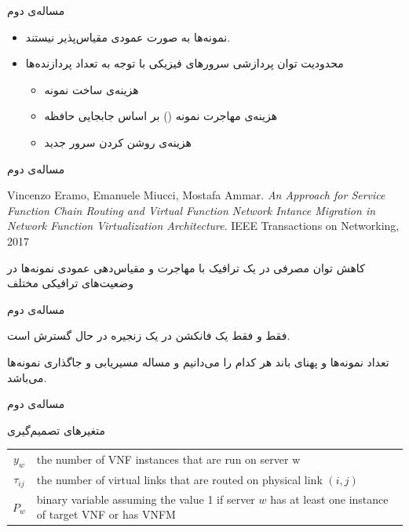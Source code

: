 \documentclass{beamer}
\makeatletter
\newcommand{\RTList}{\raggedleft\rightskip\@totalleftmargin}
\makeatother
\begin{document}
\begin{persian}
\begin{frame}{مساله‌ی دوم}
	\begin{itemize}\RTList{}
		\item نمونه‌ها به صورت عمودی مقیاس‌پذیر نیستند.
		\item محدودیت توان پردازشی سرورهای فیزیکی با توجه به تعداد پردازنده‌ها
		\begin{itemize}\RTList{}
			\item هزینه‌ی ساخت نمونه
			\item هزینه‌ی مهاجرت نمونه () بر اساس جابجایی حافظه
			\item هزینه‌ی روشن کردن سرور جدید
		\end{itemize}
	\end{itemize}
\end{frame}
\begin{frame}{مساله‌ی دوم}
	\begin{latin}\begin{thebibliography}{9}
		Vincenzo Eramo, Emanuele Miucci, Mostafa Ammar.
		\textit{An Approach for Service Function Chain Routing and Virtual Function Network Intance Migration in Network Function Virtualization Architecture}. 
		IEEE Transactions on Networking, 2017
	\end{thebibliography}\end{latin}
	\par
	کاهش توان مصرفی در یک ترافیک 
	با مهاجرت و مقیاس‌دهی عمودی نمونه‌ها در وضعیت‌های ترافیکی مختلف
\end{frame}
\begin{frame}{مساله‌ی دوم}
	\par
	فقط و فقط یک فانکشن در یک زنجیره در حال گسترش است.
	\par
	تعداد نمونه‌ها و پهنای باند هر کدام را می‌دانیم و مساله مسیریابی و جاگذاری نمونه‌ها می‌باشد.
\end{frame}
\begin{frame}{مساله‌ی دوم}
	\par
	متغیرهای تصمیم‌گیری
	\begin{latin}\begin{tabular}{c p{10cm}}
		$y_w$ & the number of VNF instances that are run on server w\\
		$\tau_{ij}$ & the number of virtual links that are routed on physical link $(i,j)$\\
		$P_w$ & binary variable assuming the value 1 if server $w$ has at least one instance of target VNF or has VNFM\\
	\end{tabular}\end{latin}

\end{frame}
\end{persian}
\end{document}
